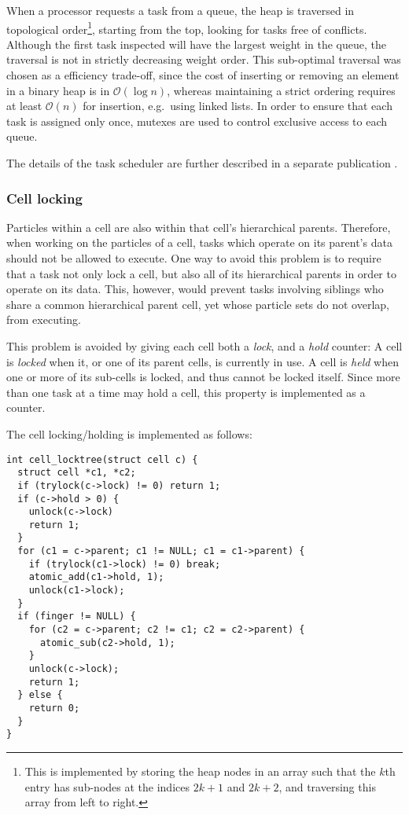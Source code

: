 \documentclass[final]{siamltex}
\newcommand{\oh}[1]
    {\mbox{$ {\mathcal O}( #1 ) $}}
\begin{document}
When a processor requests a task from a queue, the heap is
traversed in topological order\footnote{
This is implemented by storing the heap nodes in an array such that the $k$th
entry has sub-nodes at the indices $2k+1$ and $2k+2$, and traversing
this array from left to right.}, starting from the top, looking
for tasks free of conflicts.
Although the first task inspected will have the largest weight
in the queue, the traversal is not in strictly decreasing weight
order.
This sub-optimal traversal was chosen as a efficiency trade-off,
since the cost of inserting or removing an element in a binary heap is in
\oh{\log n}, whereas maintaining a strict ordering requires
at least \oh{n} for insertion, e.g.~using linked lists.
In order to ensure that each task is assigned only once, mutexes
are used to control exclusive access to each queue.

The details of the task scheduler are further described in a separate
publication \cite{ref:Gonnet2013b}.


\subsubsection{Cell locking}
\label{sec:locking}

Particles within a cell are also within that cell's hierarchical
parents.
Therefore, when working on the particles of a cell, tasks which
operate on its parent's data should not be allowed to execute.
One way to avoid this problem is to require that a task
not only lock a cell, but also all of its hierarchical
parents in order to operate on its data.
This, however, would prevent tasks involving siblings who share
a common hierarchical parent cell, yet
whose particle sets do not overlap, from executing.

This problem is avoided by giving each cell both a {\em lock},
and a {\em hold} counter:
A cell is {\em locked} when it, or one of its parent cells, is currently
in use. A cell is {\em held} when one or more of its sub-cells is locked,
and thus cannot be locked itself.
Since more than one task at a time may hold a cell, this property
is implemented as a counter.

The cell locking/holding is implemented as follows:
        
\begin{center}\begin{minipage}{0.8\textwidth}
    \begin{lstlisting}
int cell_locktree(struct cell c) {
  struct cell *c1, *c2;
  if (trylock(c->lock) != 0) return 1;
  if (c->hold > 0) {
    unlock(c->lock)
    return 1;
  }
  for (c1 = c->parent; c1 != NULL; c1 = c1->parent) {
    if (trylock(c1->lock) != 0) break;
    atomic_add(c1->hold, 1);
    unlock(c1->lock);
  }
  if (finger != NULL) {
    for (c2 = c->parent; c2 != c1; c2 = c2->parent) {
      atomic_sub(c2->hold, 1);
    }
    unlock(c->lock);
    return 1;
  } else {
    return 0;
  }
}
    \end{lstlisting}
\end{minipage}\end{center}
\end{document}
